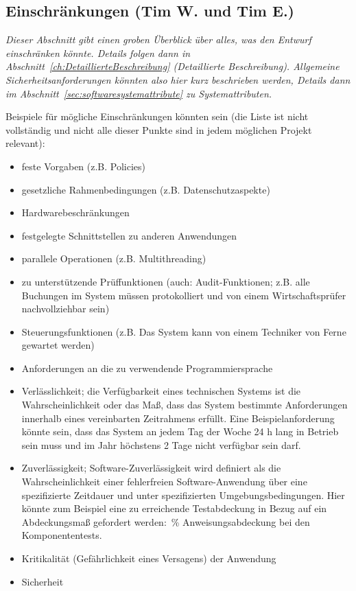 \documentclass[fontsize=12pt,paper=a4,twoside]{scrartcl}
\begin{document}
\subsection{Einschränkungen (Tim W. und Tim E.)}
\label{sec:Einschraenkungen}
{\em Dieser Abschnitt gibt einen groben Überblick über alles, was den
  Entwurf einschränken könnte. Details folgen dann in
  Abschnitt~\ref{ch:DetaillierteBeschreibung} (\glqq Detaillierte
  Beschreibung\grqq). Allgemeine Sicherheitsanforderungen könnten also
  hier kurz beschrieben werden, Details dann im
  Abschnitt~\ref{sec:softwaresystemattribute} zu Systemattributen.

  Beispiele für mögliche Einschränkungen könnten sein (die Liste ist
  nicht vollständig und nicht alle dieser Punkte sind in jedem
  möglichen Projekt relevant):

  \begin{itemize}
   \item feste Vorgaben (z.B. Policies)
   \item gesetzliche Rahmenbedingungen (z.B. Datenschutzaspekte)
   \item Hardwarebeschränkungen
   \item festgelegte Schnittstellen zu anderen Anwendungen
   \item parallele Operationen (z.B. Multithreading)
   \item zu unterstützende Prüffunktionen (auch: Audit-Funktionen;
     z.B. \glqq alle Buchungen im System müssen protokolliert und von
     einem Wirtschaftsprüfer nachvollziehbar sein\grqq)
   \item Steuerungsfunktionen (z.B. \glqq Das System kann von einem
     Techniker von Ferne gewartet werden\grqq)
   \item Anforderungen an die zu verwendende Programmiersprache
   \item Verlässlichkeit; die Verfügbarkeit eines technischen Systems 
       ist die Wahrscheinlichkeit oder das Maß, dass das System 
       bestimmte Anforderungen innerhalb eines vereinbarten
       Zeitrahmens erfüllt. Eine Beispielanforderung könnte sein, dass
       das System an jedem Tag der Woche 24 h lang in Betrieb sein 
       muss und im Jahr höchstens 2 Tage nicht verfügbar sein darf.
   \item Zuverlässigkeit; Software-Zuverlässigkeit wird definiert 
      als die Wahrscheinlichkeit einer fehlerfreien Software-Anwendung 
      über eine spezifizierte Zeitdauer und unter spezifizierten
      Umgebungsbedingungen. Hier könnte zum Beispiel eine zu
      erreichende Testabdeckung in Bezug auf ein Abdeckungsmaß
      gefordert werden: \,\% Anweisungsabdeckung bei den
      Komponententests\grqq.
   \item Kritikalität (Gefährlichkeit eines Versagens) der Anwendung
   \item Sicherheit
  \end{itemize}

}
\end{document}
